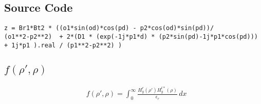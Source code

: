 \documentclass[11pt, oneside]{article}   	%
\begin{document}
\subsection{Source Code}

\begin{lstlisting}
z = Br1*Bt2 * ((o1*sin(od)*cos(pd) - p2*cos(od)*sin(pd))/        (o1**2-p2**2)  + 2*(D1 * (exp(-1j*p1*d) * (p2*sin(pd)-1j*p1*cos(pd))) + 1j*p1 ).real / (p1**2-p2**2) )
\end{lstlisting}





\subsection{$f(\rho ', \rho)$}

\begin{align*}
&f (\rho ',\rho) = \int_{0}^{\infty} \frac{H_{y}^{r} (\rho ') H_{y}^{t*} (\rho)}{\epsilon_{r}} \, dx
\end{align*}
\end{document}
